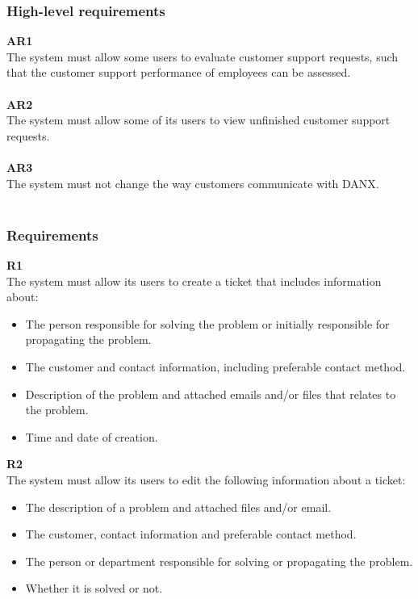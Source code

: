 \subsubsection{High-level requirements}
\textbf{AR1} \\
The system must allow some users to evaluate customer support requests, such that the customer support performance of employees can be assessed. \\ \\

\textbf{AR2} \\
The system must allow some of its users to view unfinished customer support requests. \\ \\

\textbf{AR3} \\
The system must not change the way customers communicate with DANX. \\ \\
\subsubsection{Requirements}
\textbf{R1} \\
The system must allow its users to create a ticket that includes information about:
\begin{itemize}
\item The person responsible for solving the problem or initially responsible for propagating the problem.
\item The customer and contact information, including preferable contact method.
\item Description of the problem and attached emails and/or files that relates to the problem.
\item Time and date of creation.
\end{itemize}

\textbf{R2} \\
The system must allow its users to edit the following information about a ticket:
\begin{itemize}
\item The description of a problem and attached files and/or email.
\item The customer, contact information and preferable contact method.
\item The person or department responsible for solving or propagating the problem.
\item Whether it is solved or not.
\end{itemize}

